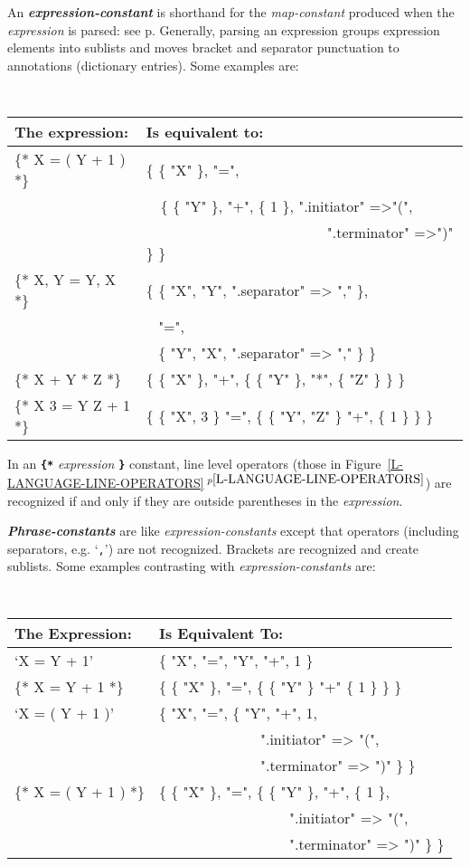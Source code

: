 \documentclass[12pt]{article}
\newcommand{\TT}[1]{{\tt \bfseries #1}}
\newcommand{\emkey}[1]{{\em \bfseries #1}}
\newcommand{\itemref}[1]{\ref{#1}$\,^{p\pageref{#1}}$}
\newcommand{\pagref}[1]{p\pageref{#1}}
\begin{document}
An \emkey{expression-constant}\label{EXPRESSION-CONSTANT}
is shorthand for the {\em map-constant}
produced when the {\em expression} is parsed: see \pagref{PARSER-OUTPUT}.
Generally, parsing an expression groups expression elements into
sublists and moves bracket and separator punctuation to annotations
(dictionary entries).  Some examples are:
\begin{center} \tt
\begin{tabular}{l@{~~~}l}
\rm The expression:	& \rm Is equivalent to:
\\\hline
\{* X = ( Y + 1 ) *\}	& \{ \{ "X" \}, "=", \\
			&  ~~\{ \{ "Y" \}, "+", \{ 1 \}, ".initiator" =>"(", \\
			& ~~~~~~~~~~~~~~~~~~~~~~~~~".terminator" =>")" \} \}
\\[0.5ex]
\{* X, Y = Y, X *\}	& \{ \{ "X", "Y", ".separator" => "," \}, \\
			&  ~ "=", \\
			&  ~ \{ "Y", "X", ".separator" => "," \} \}
\\[0.5ex]
\{* X + Y * Z *\}	& \{ \{ "X" \}, "+", \{ \{ "Y" \}, "*", \{ "Z" \} \} \}
\\[0.5ex]
\{* X 3 = Y Z + 1 *\}	& \{ \{ "X", 3 \} "=",
                             \{ \{ "Y", "Z" \} "+", \{ 1 \} \} \}
\end{tabular}
\end{center}
In an \TT{\{*} {\em expression} \TT{*\}} constant,
line level operators (those in Figure~\itemref{L-LANGUAGE-LINE-OPERATORS})
are recognized if and only if
they are outside parentheses in the {\em expression}.

\emkey{Phrase-constants}\label{PHRASE-CONSTANT}
are like {\em expression-constants} except that
operators (including separators, e.g. `{\tt ,}') are not recognized.
Brackets are recognized and create sublists.  Some examples contrasting
with {\em expression-constants} are:
\begin{center} \tt
\begin{tabular}{l@{~~~}l}
\rm The Expression:	& \rm Is Equivalent To:
\\\hline
`X = Y + 1'			& \{ "X", "=", "Y", "+", 1 \}
\\[0.5ex]
\{* X = Y + 1 *\}		& \{ \{ "X" \}, "=",
                                     \{ \{ "Y" \} "+" \{ 1 \} \} \}
\\[0.5ex]
`X = ( Y + 1 )'		& \{ "X", "=", \{ "Y", "+", 1, \\
                        & ~~~~~~~~~~~~~~".initiator" => "(", \\
                        & ~~~~~~~~~~~~~~".terminator" => ")" \} \}
\\[0.5ex]
\{* X = ( Y + 1 ) *\}	& \{ \{ "X" \}, "=", \{ \{ "Y" \}, "+", \{ 1 \}, \\
                        & ~~~~~~~~~~~~~~~~~~".initiator" => "(", \\
                        & ~~~~~~~~~~~~~~~~~~".terminator" => ")" \} \}
\end{tabular}
\end{center}
\end{document}
